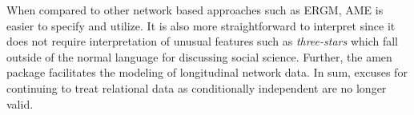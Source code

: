 \documentclass[11pt,pdflatex]{elsarticle}
\newcommand{\pkg}[1]{{\fontseries{b}\selectfont #1}}
\begin{document}
When compared to other network based approaches such as ERGM, AME is easier to specify and utilize. It is also more straightforward to interpret since it does not require interpretation of unusual features such as \textit{three-stars} which fall outside of the normal language for discussing social science. Further, the \pkg{amen} package facilitates the modeling of longitudinal network data. In sum, excuses for continuing to treat relational data as conditionally independent are no longer valid. 

\clearpage


\clearpage
% 

% 
\newpage
\end{document}
